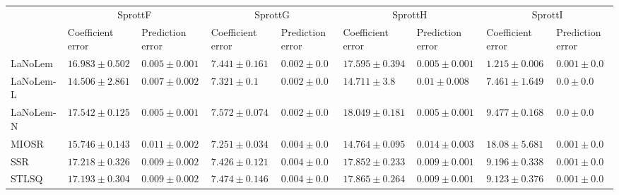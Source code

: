 \begin{table*}
{\begin{tabular}{lllllllll}
 & \multicolumn{2}{c}{SprottF} & \multicolumn{2}{c}{SprottG} & \multicolumn{2}{c}{SprottH} & \multicolumn{2}{c}{SprottI} \\
 & Coefficient error & Prediction error & Coefficient error & Prediction error & Coefficient error & Prediction error & Coefficient error & Prediction error \\
\midrule
LaNoLem & $16.983\pm 0.502$ & $\mathbf{0.005}\pm 0.001$ & $7.441\pm 0.161$ & $\mathbf{0.002}\pm 0.0$ & $17.595\pm 0.394$ & $\mathbf{0.005}\pm 0.001$ & $\mathbf{1.215}\pm 0.006$ & $0.001\pm 0.0$ \\
LaNoLem-L & $\mathbf{14.506}\pm 2.861$ & $0.007\pm 0.002$ & $7.321\pm 0.1$ & $0.002\pm 0.0$ & $\mathbf{14.711}\pm 3.8$ & $0.01\pm 0.008$ & $7.461\pm 1.649$ & $0.0\pm 0.0$ \\
LaNoLem-N & $17.542\pm 0.125$ & $0.005\pm 0.001$ & $7.572\pm 0.074$ & $0.002\pm 0.0$ & $18.049\pm 0.181$ & $0.005\pm 0.001$ & $9.477\pm 0.168$ & $\mathbf{0.0}\pm 0.0$ \\
MIOSR & $15.746\pm 0.143$ & $0.011\pm 0.002$ & $\mathbf{7.251}\pm 0.034$ & $0.004\pm 0.0$ & $14.764\pm 0.095$ & $0.014\pm 0.003$ & $18.08\pm 5.681$ & $0.001\pm 0.0$ \\
SSR & $17.218\pm 0.326$ & $0.009\pm 0.002$ & $7.426\pm 0.121$ & $0.004\pm 0.0$ & $17.852\pm 0.233$ & $0.009\pm 0.001$ & $9.196\pm 0.338$ & $0.001\pm 0.0$ \\
STLSQ & $17.193\pm 0.304$ & $0.009\pm 0.002$ & $7.474\pm 0.146$ & $0.004\pm 0.0$ & $17.865\pm 0.264$ & $0.009\pm 0.001$ & $9.123\pm 0.376$ & $0.001\pm 0.0$ \\

\midrule


\end{tabular}}
\end{table*}
